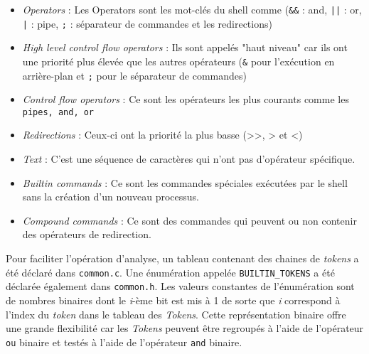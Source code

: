 \documentclass[12pt]{article}
\begin{document}
\begin{itemize}
    \item \textit{Operators} : Les Operators sont les mot-clés du shell comme (\texttt{\&\&} : and, \texttt{||} : or, \texttt{|} : pipe, \texttt{;} : séparateur de commandes et les redirections) 
    \item \textit{High level control flow operators} :  Ils sont appelés "haut niveau" car ils ont une priorité plus élevée que les autres opérateurs (\texttt{\&} pour l'exécution en arrière-plan et \texttt{;} pour le séparateur de commandes)
    \item \textit{Control flow operators} : Ce sont les opérateurs les plus courants comme les \texttt{pipes, and, or}
    \item \textit{Redirections} : Ceux-ci ont la priorité la plus basse (>{}>, > et <)
    \item \textit{Text} : C'est une séquence de caractères qui n'ont pas d'opérateur spécifique.
    \item \textit{Builtin commands} : Ce sont les commandes spéciales exécutées par le shell sans la création d'un nouveau processus. 
    \item \textit{Compound commands} : Ce sont des commandes qui peuvent ou non contenir des opérateurs de redirection.
\end{itemize}

Pour faciliter l'opération d'analyse, un tableau contenant des chaines de \textit{tokens} a été déclaré dans \texttt{common.c}. Une énumération appelée \texttt{BUILTIN\_TOKENS} a été déclarée également dans \texttt{common.h}. Les valeurs constantes de l'énumération sont de nombres binaires dont le \textit{i}-ème bit est mis à 1 de sorte que \textit{i} correspond à l'index du \textit{token} dans le tableau des \textit{Tokens}. Cette représentation binaire offre une grande flexibilité car les \textit{Tokens} peuvent être regroupés à l'aide de l'opérateur \texttt{ou} binaire et testés à l'aide de l'opérateur \texttt{and} binaire.
\end{document}

